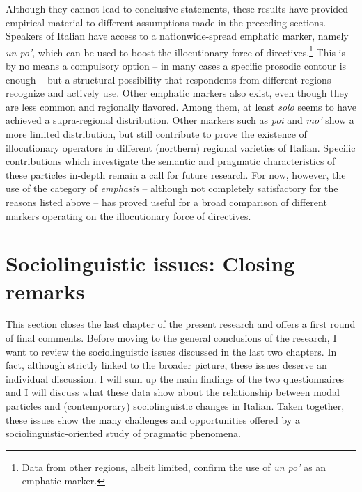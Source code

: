 Although they cannot lead to conclusive statements, these results have provided empirical material to different assumptions made in the preceding sections. Speakers of Italian have access to a nationwide-spread emphatic marker, namely \textit{un po’}, which can be used to boost the illocutionary force of directives.\footnote{Data from other regions, albeit limited, confirm the use of \textit{un po’} as an emphatic marker.} This is by no means a compulsory option – in many cases a specific prosodic contour is enough – but a structural possibility that respondents from different regions recognize and actively use. Other emphatic markers also exist, even though they are less common and regionally flavored. Among them, at least \textit{solo} seems to have achieved a supra-regional distribution. Other markers such as \textit{poi} and \textit{mo’} show a more limited distribution, but still contribute to prove the existence of illocutionary operators in different (northern) regional varieties of Italian. Specific contributions which investigate the semantic and pragmatic characteristics of these particles in-depth remain a call for future research. For now, however, the use of the category of \textit{emphasis} – although not completely satisfactory for the reasons listed above – has proved useful for a broad comparison of different markers operating on the illocutionary force of directives.

\section{Sociolinguistic issues: Closing remarks}
\hypertarget{Toc124860689}{}
This section closes the last chapter of the present research and offers a first round of final comments. Before moving to the general conclusions of the research, I want to review the sociolinguistic issues discussed in the last two chapters. In fact, although strictly linked to the broader picture, these issues deserve an individual discussion. I will sum up the main findings of the two questionnaires and I will discuss what these data show about the relationship between modal particles and (contemporary) sociolinguistic changes in Italian. Taken together, these issues show the many challenges and opportunities offered by a sociolinguistic-oriented study of pragmatic phenomena.

